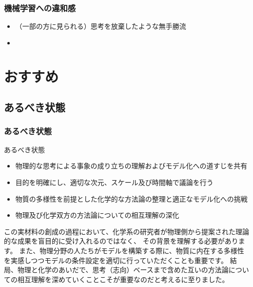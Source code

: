 \documentclass[12pt, dvipdfmx]{beamer}
\begin{document}
\begin{frame}
    \frametitle{機械学習への違和感}

    \begin{itemize}
        \item （一部の方に見られる）思考を放棄したような無手勝流
        \item 
    \end{itemize}

\end{frame}


\section{おすすめ}
\subsection{あるべき状態}
\begin{frame}
    \frametitle{あるべき状態}

    \begin{block}{あるべき状態}
        \begin{itemize}
            \item 物理的な思考による事象の成り立ちの理解およびモデル化への道すじを共有
            \item 目的を明確にし、適切な次元、スケール及び時間軸で議論を行う
            \item 物質の多様性を前提とした化学的な方法論の整理と適正なモデル化への挑戦
            \item 物理及び化学双方の方法論についての相互理解の深化
        \end{itemize}
    \end{block}
    この実材料の創成の過程において、化学系の研究者が物理側から提案された理論的な成果を盲目的に受け入れるのではなく、
その背景を理解する必要があります。
また、物理分野の人たちがモデルを構築する際に、物質に内在する多様性を実感しつつモデルの条件設定を適切に行っていただくことも重要です。
結局、物理と化学のあいだで、思考（志向）ベースまで含めた互いの方法論についての相互理解を深めていくことこそが重要なのだと考えるに至りました。
\end{frame}
\end{document}
